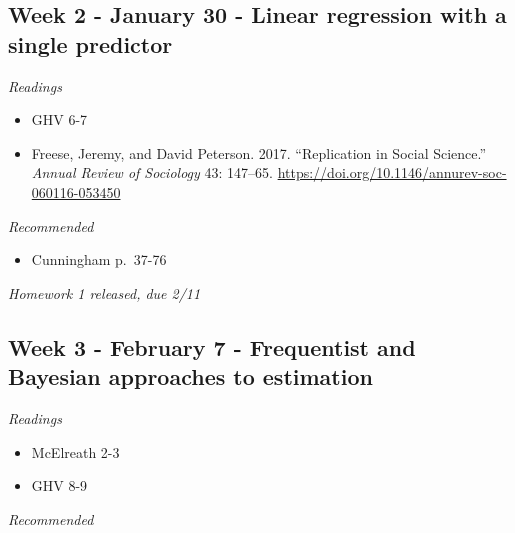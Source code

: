 \documentclass[
  10pt,
]{article}
\providecommand{\tightlist}{%
  \setlength{\itemsep}{0pt}\setlength{\parskip}{0pt}}
\begin{document}
\hypertarget{week-2---january-30---linear-regression-with-a-single-predictor}{%
\subsection{Week 2 - January 30 - Linear regression with a single
predictor}\label{week-2---january-30---linear-regression-with-a-single-predictor}}

\emph{Readings}

\begin{itemize}
\tightlist
\item
  GHV 6-7
\item
  Freese, Jeremy, and David Peterson. 2017. ``Replication in Social
  Science.'' \emph{Annual Review of Sociology} 43: 147--65.
  \url{https://doi.org/10.1146/annurev-soc-060116-053450}
\end{itemize}

\emph{Recommended}

\begin{itemize}
\tightlist
\item
  Cunningham p.~37-76
\end{itemize}

\emph{Homework 1 released, due 2/11}

\hypertarget{week-3---february-7---frequentist-and-bayesian-approaches-to-estimation}{%
\subsection{Week 3 - February 7 - Frequentist and Bayesian approaches to
estimation}\label{week-3---february-7---frequentist-and-bayesian-approaches-to-estimation}}

\emph{Readings}

\begin{itemize}
\tightlist
\item
  McElreath 2-3
\item
  GHV 8-9
\end{itemize}

\emph{Recommended}
\end{document}
